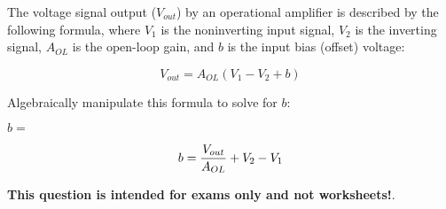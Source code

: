 

The voltage signal output ($V_{out}$) by an operational amplifier is described by the following formula, where $V_1$ is the noninverting input signal, $V_2$ is the inverting signal, $A_{OL}$ is the open-loop gain, and $b$ is the input bias (offset) voltage:

$$V_{out} = A_{OL} (V_1 - V_2 + b)$$

Algebraically manipulate this formula to solve for $b$:

\vskip 20pt

$b = $







$$b = {V_{out} \over A_{OL}} + V_2 - V_1$$







{\bf This question is intended for exams only and not worksheets!}.




